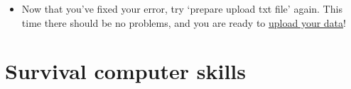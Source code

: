 \documentclass[11pt]{book}
\begin{document}
{\begin{itemize}
    \texttt{[image: EPSFiles/MM\_validation\_mainframe.eps]}

    Open the result grid to fix the error.  Click `Show help' for more information about validations.  In this case, it is a simple fix: add method code `LP-PI' to the average V[A]DM result.

    \texttt{[image: EPSFiles/MM\_filled\_in\_result\_validation.eps]}

  \item Now that you've fixed your error, try `prepare upload txt file' again.  This time there should be no problems, and you are ready to \href{#magic_upload}{upload your data}!

\end{itemize}




%
%
%
%





\chapter{Survival computer skills}
\label{ex:unix}

}
\end{document}

